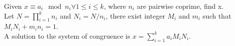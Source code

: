 Given $x \equiv a_i \mod n_i \forall 1 \leq i \leq k$, where $n_i$ are pairwise coprime, find x. \\
Let $N = \prod_{i = 1}^{k}{n_i}$ and $N_i = N / n_i$, there exist integer $M_i$ and $m_i$ such that $M_iN_i + m_in_i = 1$. \\
A solution to the system of congruence is $x = \sum_{i = 1}^{k}{a_iM_iN_i}$. 
